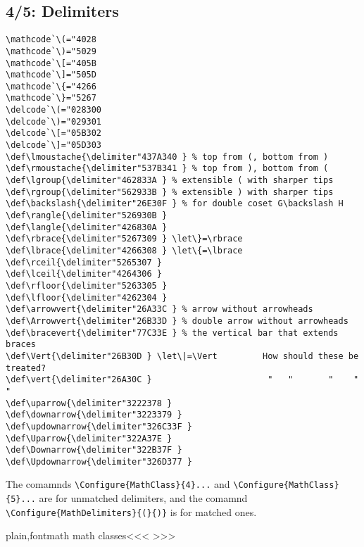 {{\subsection{4/5: Delimiters}

\begin{verbatim}
\mathcode`\(="4028
\mathcode`\)="5029
\mathcode`\[="405B
\mathcode`\]="505D
\mathcode`\{="4266
\mathcode`\}="5267
\delcode`\(="028300
\delcode`\)="029301
\delcode`\[="05B302
\delcode`\]="05D303
\def\lmoustache{\delimiter"437A340 } % top from (, bottom from )
\def\rmoustache{\delimiter"537B341 } % top from ), bottom from (
\def\lgroup{\delimiter"462833A } % extensible ( with sharper tips
\def\rgroup{\delimiter"562933B } % extensible ) with sharper tips
\def\backslash{\delimiter"26E30F } % for double coset G\backslash H
\def\rangle{\delimiter"526930B }
\def\langle{\delimiter"426830A }
\def\rbrace{\delimiter"5267309 } \let\}=\rbrace
\def\lbrace{\delimiter"4266308 } \let\{=\lbrace
\def\rceil{\delimiter"5265307 }
\def\lceil{\delimiter"4264306 }
\def\rfloor{\delimiter"5263305 }
\def\lfloor{\delimiter"4262304 }
\def\arrowvert{\delimiter"26A33C } % arrow without arrowheads
\def\Arrowvert{\delimiter"26B33D } % double arrow without arrowheads
\def\bracevert{\delimiter"77C33E } % the vertical bar that extends braces
\def\Vert{\delimiter"26B30D } \let\|=\Vert         How should these be treated?
\def\vert{\delimiter"26A30C }                       "   "       "    "   "
\def\uparrow{\delimiter"3222378 }
\def\downarrow{\delimiter"3223379 }
\def\updownarrow{\delimiter"326C33F }
\def\Uparrow{\delimiter"322A37E }
\def\Downarrow{\delimiter"322B37F }
\def\Updownarrow{\delimiter"326D377 }
\end{verbatim}

The comamnds \verb'\Configure{MathClass}{4}...'
and \verb'\Configure{MathClass}{5}...'
are for unmatched delimiters, and the comamnd
\verb'\Configure{MathDelimiters}{(}{)}' is for matched ones.


\<plain,fontmath math classes\><<<
>>>

}}

